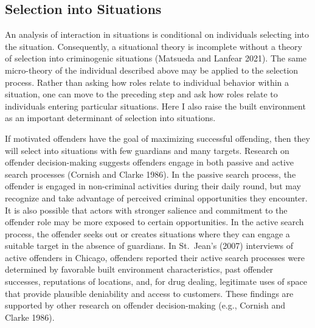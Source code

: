 \documentclass [11pt, proquest] {uwthesis}[2015/03/03]
\begin{document}
\hypertarget{selection-into-situations}{%
\subsection{Selection into Situations}\label{selection-into-situations}}

An analysis of interaction in situations is conditional on individuals selecting into the situation. Consequently, a situational theory is incomplete without a theory of selection into criminogenic situations (Matsueda and Lanfear 2021). The same micro-theory of the individual described above may be applied to the selection process. Rather than asking how roles relate to individual behavior within a situation, one can move to the preceding step and ask how roles relate to individuals entering particular situations. Here I also raise the built environment as an important determinant of selection into situations.

If motivated offenders have the goal of maximizing successful offending, then they will select into situations with few guardians and many targets. Research on offender decision-making suggests offenders engage in both passive and active search processes (Cornish and Clarke 1986). In the passive search process, the offender is engaged in non-criminal activities during their daily round, but may recognize and take advantage of perceived criminal opportunities they encounter. It is also possible that actors with stronger salience and commitment to the offender role may be more exposed to certain opportunities. In the active search process, the offender seeks out or creates situations where they can engage a suitable target in the absence of guardians. In St.~Jean's (2007) interviews of active offenders in Chicago, offenders reported their active search processes were determined by favorable built environment characteristics, past offender successes, reputations of locations, and, for drug dealing, legitimate uses of space that provide plausible deniability and access to customers. These findings are supported by other research on offender decision-making (e.g., Cornish and Clarke 1986).
\end{document}
